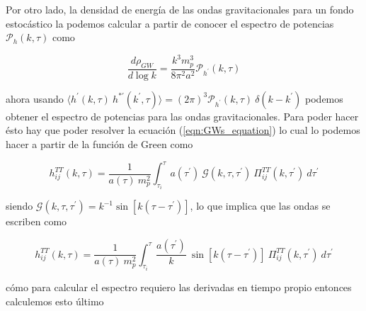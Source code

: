 Por otro lado, la densidad de energía de las ondas gravitacionales para un fondo estocástico la podemos calcular a partir de conocer el espectro de potencias $\mathcal{P}_h \left( k, \tau \right)$ como

\begin{equation}
    \frac{d \rho_{GW}}{d \log k} = \frac{k^3 m_p^3}{8 \pi^2 a^2} \mathcal{P}_{h^\prime} (k, \tau)
\end{equation}

\noindent
ahora usando $\langle h^\prime (k, \tau) ~ h^{* \prime} (k^\prime, \tau) \rangle = (2\pi)^3 \mathcal{P}_{h^\prime} (k, \tau) ~ \delta (k - k^\prime)$ podemos obtener el espectro de potencias para las ondas gravitacionales. Para poder hacer ésto hay que poder resolver la ecuación (\ref{eqn:GWs_equation}) lo cual lo podemos hacer a partir de la función de Green como

\begin{equation}
    h_{ij}^{TT} (k, \tau) = \frac{1}{a(\tau) ~ m_p^2} \int_{\tau_i}^{\tau} a(\tau^\prime) ~ \mathcal{G} (k, \tau, \tau^\prime) ~ \Pi_{ij}^{TT} (k, \tau^\prime) ~ d\tau^\prime
\end{equation}

\noindent
siendo $\mathcal{G} (k, \tau, \tau^\prime) = k^{-1} \sin \left[k \left( \tau - \tau^\prime \right) \right]$, lo que implica que las ondas se escriben como

\begin{equation}
    h_{ij}^{TT} (k, \tau) = \frac{1}{a(\tau) ~ m_p^2} \int_{\tau_i}^{\tau} \frac{a \left( \tau^\prime \right)}{k} ~ \sin \left[ k \left( \tau - \tau^\prime \right) \right] ~ \Pi_{ij}^{TT} (k, \tau^\prime) ~ d\tau^\prime
\end{equation}

\noindent
cómo para calcular el espectro requiero las derivadas en tiempo propio entonces calculemos esto último

